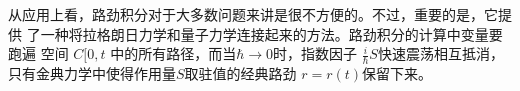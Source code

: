 从应用上看，路劲积分对于大多数问题来讲是很不方便的。不过，重要的是，它提供
了一种将拉格朗日力学和量子力学连接起来的方法。路劲积分的计算中变量要跑遍
空间 $C[0,t$ 中的所有路径，而当$\hbar\rightarrow 0$时，指数因子 $\frac{i}{\hbar}S$快速震荡相互抵消，只有金典力学中使得作用量$S$取驻值的经典路劲
$r=r(t)$保留下来。
